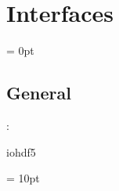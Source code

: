 
\section{Interfaces} 


\parskip = 0pt

\vspace{3mm} \subsection*{General}

: 

iohdf5
\vspace{2mm}

\vspace{5mm}\parskip = 10pt 
